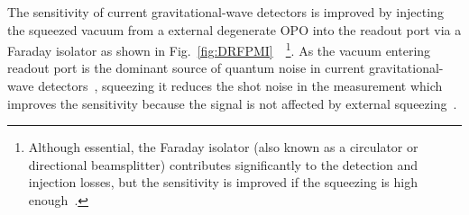 The sensitivity of current gravitational-wave detectors is improved by injecting the squeezed vacuum from a external degenerate OPO into the readout port via a Faraday isolator as shown in Fig.~\ref{fig:DRFPMI}~\cite{}~\footnote{Although essential, the Faraday isolator (also known as a circulator or directional beamsplitter) contributes significantly  to the detection and injection losses, but the sensitivity is improved if the squeezing is high enough~\cite{}.}.
As the vacuum entering readout port is the dominant source of quantum noise in current gravitational-wave detectors~\cite{}, squeezing it reduces the shot noise in the measurement  which improves the sensitivity because the signal is not affected by external squeezing~\cite{}.
